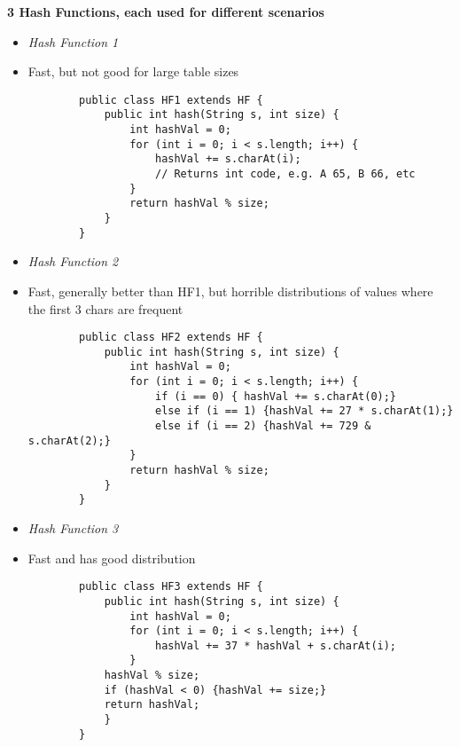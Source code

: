 \documentclass[10pt, 
a4paper, 
oneside, 
headinclude, footinclude, 
BCOR5mm]
{scrartcl}
\begin{document}
\textbf{3 Hash Functions, each used for different scenarios}
\begin{itemize}
    \item \textit{Hash Function 1}
    \item Fast, but not good for large table sizes
    \begin{lstlisting}
        public class HF1 extends HF {
            public int hash(String s, int size) {
                int hashVal = 0;
                for (int i = 0; i < s.length; i++) {
                    hashVal += s.charAt(i);
                    // Returns int code, e.g. A 65, B 66, etc
                }
                return hashVal % size;
            }
        }
    \end{lstlisting}
    \newpage

    \item \textit{Hash Function 2}
    \item Fast, generally better than HF1, but horrible distributions of values where the first 3 chars are frequent
    \begin{lstlisting}
        public class HF2 extends HF {
            public int hash(String s, int size) {
                int hashVal = 0;
                for (int i = 0; i < s.length; i++) {
                    if (i == 0) { hashVal += s.charAt(0);}
                    else if (i == 1) {hashVal += 27 * s.charAt(1);}
                    else if (i == 2) {hashVal += 729 & s.charAt(2);}
                }
                return hashVal % size;
            }
        }
    \end{lstlisting}

    \item \textit{Hash Function 3}
    \item Fast and has good distribution
    \begin{lstlisting}
        public class HF3 extends HF {
            public int hash(String s, int size) {
                int hashVal = 0;
                for (int i = 0; i < s.length; i++) {
                    hashVal += 37 * hashVal + s.charAt(i);
                }
            hashVal % size;
            if (hashVal < 0) {hashVal += size;}
            return hashVal;
            }
        }
    \end{lstlisting}
\end{itemize}
\end{document}
